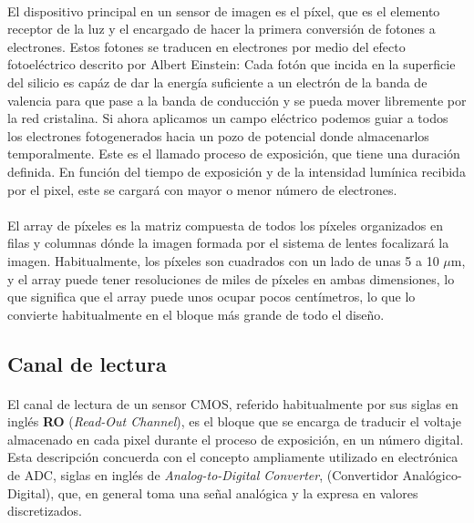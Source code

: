 \paragraph{}

El dispositivo principal en un sensor de imagen es el píxel, que es el elemento
receptor de la luz y el encargado de hacer la primera conversión de fotones a
electrones. Estos fotones se traducen en electrones por medio del efecto fotoeléctrico
descrito por Albert Einstein: Cada fotón que incida en la superficie del silicio
es capáz de dar la energía suficiente a un electrón de la banda de valencia para que
pase a la banda de conducción y se pueda mover libremente por la red cristalina.
Si ahora aplicamos un campo eléctrico podemos guiar a todos los electrones
fotogenerados hacia un pozo de potencial donde almacenarlos temporalmente. Este
es el llamado proceso de exposición, que tiene una duración definida. En función
del tiempo de exposición y de la intensidad lumínica recibida por el pixel, este
se cargará con mayor o menor número de electrones.

\paragraph{}
El array de píxeles es la matriz compuesta de todos los píxeles organizados en filas
y columnas dónde la imagen formada por el sistema de lentes focalizará la imagen.
Habitualmente, los píxeles son cuadrados con un lado de unas 5 a 10 $\mu$m, y el
array puede tener resoluciones de miles de píxeles en ambas dimensiones, lo que
significa que el array puede unos ocupar pocos centímetros, lo que lo convierte
habitualmente en el bloque más grande de todo el diseño.

\subsection{Canal de lectura}
\paragraph{}
El canal de lectura de un sensor CMOS, referido habitualmente por sus
siglas en inglés \textbf{RO} (\textit{Read-Out Channel}), es el bloque que se
encarga de traducir el voltaje almacenado en cada pixel durante el proceso
de exposición, en un número digital. Esta descripción concuerda con el concepto
ampliamente utilizado en electrónica de ADC, siglas en inglés de \textit{Analog-to-Digital
Converter}, (Convertidor Analógico-Digital), que, en general toma una señal
analógica y la expresa en valores discretizados.


